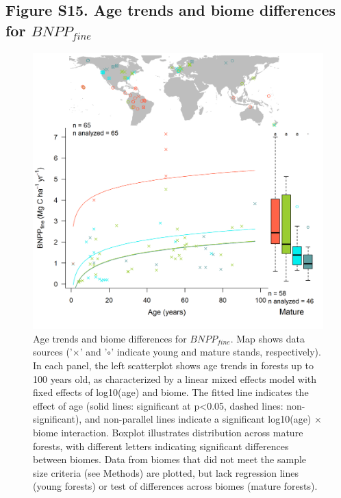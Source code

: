 \documentclass[
]{article}
\begin{document}
\newpage

\hypertarget{figure-s15.-age-trends-and-biome-differences-for-bnpp_fine}{%
\subsection{\texorpdfstring{Figure S15. Age trends and biome differences
for
\(BNPP_{fine}\)}{Figure S15. Age trends and biome differences for BNPP\_\{fine\}}}\label{figure-s15.-age-trends-and-biome-differences-for-bnpp_fine}}

\begin{figure}[H]

{\centering \includegraphics[width=1\linewidth]{tables_figures/age_trends/BNPP_fine_with_map} 

}

\caption{Age trends and biome differences for $BNPP_{fine}$. Map shows data sources ('$\times$' and '$\circ$' indicate young and mature stands, respectively). In each panel, the left scatterplot shows age trends in forests up to 100 years old, as characterized by a linear mixed effects model with fixed effects of log10(age) and biome. The fitted line indicates the effect of age (solid lines: significant at p<0.05, dashed lines: non-significant), and non-parallel lines indicate a significant log10(age) $\times$ biome interaction. Boxplot illustrates distribution across mature forests, with different letters indicating significant differences between biomes. Data from biomes that did not meet the sample size criteria (see Methods) are plotted, but lack regression lines (young forests) or test of differences across biomes (mature forests).}\label{fig:unnamed-chunk-18}
\end{figure}
\end{document}
